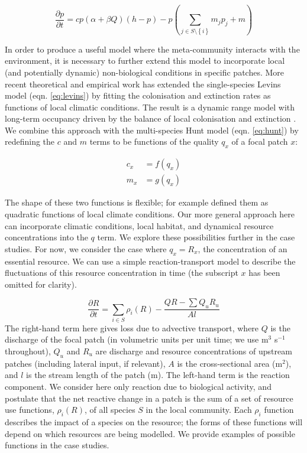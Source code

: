 \begin{equation}
	\frac{\partial p}{\partial t} = c p(\alpha + \beta Q) \left( h-p \right) - p \left( \sum_{j \in S \setminus \left\{i \right\} }{m_{j}p_j} + m \right)
	\label{eq:metacom}
\end{equation}

In order to produce a useful model where the meta-community interacts with the environment, it is necessary to further extend this model to incorporate local (and potentially dynamic) non-biological conditions in specific patches.
More recent theoretical \autocite{Holt2000,Holt2005} and empirical \autocite{Talluto2017} work has extended the single-species Levins model (eqn. \ref{eq:levins}) by fitting the colonisation and extinction rates as functions of local climatic conditions.
The result is a dynamic range model with long-term occupancy driven by the balance of local colonisation and extinction \autocite{Talluto2017}.
We combine this approach with the multi-species Hunt model (eqn. \ref{eq:hunt}) by redefining the $c$ and $m$ terms to be functions of the quality $q_x$ of a focal patch $x$:

\begin{equation}
\begin{split}
	c_{x} &= f(q_{x}) \label{eq:talluto} \\
	m_{x} &= g(q_{x})
\end{split}
\end{equation}


The shape of these two functions is flexible; for example \textcite{Talluto2017} defined them as quadratic functions of local climate conditions.
Our more general approach here can incorporate climatic conditions, local habitat, and dynamical resource concentrations into the $q$ term.
We explore these possibilities further in the case studies.
For now, we consider the case where $q_x = R_x$, the concentration of an essential resource.
We can use a simple reaction-transport model \autocite{Soetaert2009} to describe the fluctuations of this resource concentration in time (the subscript $x$ has been omitted for clarity).

\begin{equation}
	\frac{\partial R}{\partial t} = \sum_{i \in S}{\rho_i(R)} -\frac{QR - \sum Q_u R_u}{A l} 
	\label{eq:rxn_transport}
\end{equation}
The right-hand term here gives loss due to advective transport, where $Q$ is the discharge of the focal patch (in volumetric units per unit time; we use m$^3$ s$^{-1}$ throughout), $Q_u$ and $R_u$ are discharge and resource concentrations of upstream patches (including lateral input, if relevant), $A$ is the cross-sectional area (m$^2$), and $l$ is the stream length of the patch (m).
The left-hand term is the reaction component.
We consider here only reaction due to biological activity, and postulate that the net reactive change in a patch is the sum of a set of resource use functions, $\rho_i(R)$, of all species $S$ in the local community. 
Each $\rho_i$ function describes the impact of a species on the resource; the forms of these functions will depend on which resources are being modelled.
We provide examples of possible functions in the case studies.


